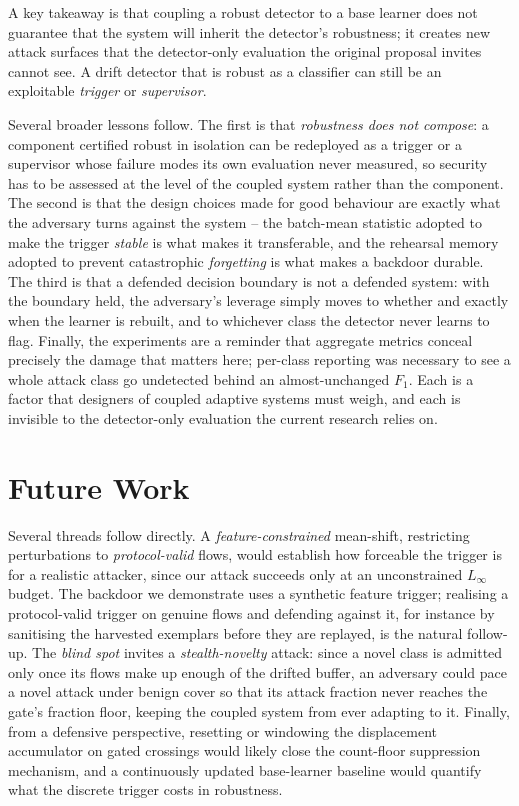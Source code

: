 A key takeaway is that coupling a robust detector to a base learner does not guarantee that the system will inherit the detector's robustness; it creates new attack surfaces that the detector-only evaluation the original proposal invites cannot see. A drift detector that is robust as a classifier can still be an exploitable \emph{trigger} or \emph{supervisor}.

Several broader lessons follow. The first is that \emph{robustness does not compose}: a component certified robust in isolation can be redeployed as a trigger or a supervisor whose failure modes its own evaluation never measured, so security has to be assessed at the level of the coupled system rather than the component. The second is that the design choices made for good behaviour are exactly what the adversary turns against the system -- the batch-mean statistic adopted to make the trigger \emph{stable} is what makes it transferable, and the rehearsal memory adopted to prevent catastrophic \emph{forgetting} is what makes a backdoor durable. The third is that a defended decision boundary is not a defended system: with the boundary held, the adversary's leverage simply moves to whether and exactly when the learner is rebuilt, and to whichever class the detector never learns to flag. Finally, the experiments are a reminder that aggregate metrics conceal precisely the damage that matters here; per-class reporting was necessary to see a whole attack class go undetected behind an almost-unchanged $F_1$. Each is a factor that designers of coupled adaptive systems must weigh, and each is invisible to the detector-only evaluation the current research relies on.

\section{Future Work}
\label{sec:conc-future}
Several threads follow directly. A \emph{feature-constrained} mean-shift, restricting perturbations to \emph{protocol-valid} flows, would establish how forceable the trigger is for a realistic attacker, since our attack succeeds only at an unconstrained $L_\infty$ budget. The backdoor we demonstrate uses a synthetic feature trigger; realising a protocol-valid trigger on genuine flows and defending against it, for instance by sanitising the harvested exemplars before they are replayed, is the natural follow-up. The \emph{blind spot} invites a \emph{stealth-novelty} attack: since a novel class is admitted only once its flows make up enough of the drifted buffer, an adversary could pace a novel attack under benign cover so that its attack fraction never reaches the gate's fraction floor, keeping the coupled system from ever adapting to it. Finally, from a defensive perspective, resetting or windowing the displacement accumulator on gated crossings would likely close the count-floor suppression mechanism, and a continuously updated base-learner baseline would quantify what the discrete trigger costs in robustness.

